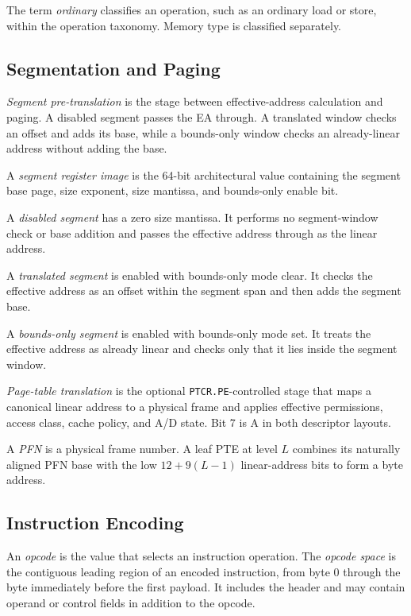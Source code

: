 The term \emph{ordinary} classifies an operation, such as an ordinary load or store, within the operation taxonomy.
Memory type is classified separately.

\subsection{Segmentation and Paging}

\emph{Segment pre-translation} is the stage between effective-address calculation and paging. A disabled segment
passes the EA through. A translated window checks an offset and adds its base, while a bounds-only window checks an
already-linear address without adding the base.

A \emph{segment register image} is the 64-bit architectural value containing the segment base page, size exponent,
size mantissa, and bounds-only enable bit.

A \emph{disabled segment} has a zero size mantissa. It performs no segment-window check or base addition and passes
the effective address through as the linear address.

A \emph{translated segment} is enabled with bounds-only mode clear. It checks the effective address as an offset
within the segment span and then adds the segment base.

A \emph{bounds-only segment} is enabled with bounds-only mode set. It treats the effective address as already linear
and checks only that it lies inside the segment window.

\emph{Page-table translation} is the optional \texttt{PTCR.PE}-controlled stage that maps a canonical linear
address to a physical frame and applies effective permissions, access class,
cache policy, and A/D state. Bit 7 is A in both descriptor layouts.

A \emph{PFN} is a physical frame number. A leaf PTE at level $L$ combines its naturally aligned PFN base with the
low $12+9(L-1)$ linear-address bits to form a byte address.

\subsection{Instruction Encoding}\label{section:instruction-encoding-terminology}

An \emph{opcode} is the value that selects an instruction operation. The \emph{opcode space} is the contiguous
leading region of an encoded instruction, from byte 0 through the byte immediately before the first payload. It
includes the header and may contain operand or control fields in addition to the opcode.

